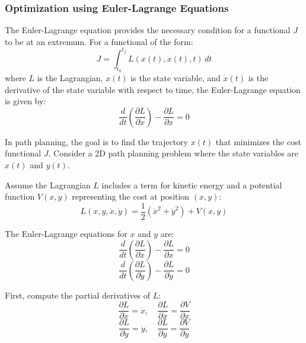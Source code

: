 \documentclass[12pt]{article}
\begin{document}
\subsubsection{Optimization using Euler-Lagrange Equations}
The Euler-Lagrange equation provides the necessary condition for a functional \( J \) to be at an extremum. For a functional of the form:
\begin{equation}
    J = \int_{t_0}^{t_f} L(x(t), \dot{x}(t), t) \, dt
\end{equation}
where \( L \) is the Lagrangian, \( x(t) \) is the state variable, and \( \dot{x}(t) \) is the derivative of the state variable with respect to time, the Euler-Lagrange equation is given by:
\begin{equation}
    \frac{d}{dt} \left( \frac{\partial L}{\partial \dot{x}} \right) - \frac{\partial L}{\partial x} = 0
\end{equation}



In path planning, the goal is to find the trajectory \( x(t) \) that minimizes the cost functional \( J \). Consider a 2D path planning problem where the state variables are \( x(t) \) and \( y(t) \).



Assume the Lagrangian \( L \) includes a term for kinetic energy and a potential function \( V(x, y) \) representing the cost at position \( (x, y) \):
\begin{equation}
    L(x, y, \dot{x}, \dot{y}) = \frac{1}{2} (\dot{x}^2 + \dot{y}^2) + V(x, y)
\end{equation}

The Euler-Lagrange equations for \( x \) and \( y \) are:
\begin{equation}
    \frac{d}{dt} \left( \frac{\partial L}{\partial \dot{x}} \right) - \frac{\partial L}{\partial x} = 0
\end{equation}
\begin{equation}
    \frac{d}{dt} \left( \frac{\partial L}{\partial \dot{y}} \right) - \frac{\partial L}{\partial y} = 0
\end{equation}



First, compute the partial derivatives of \( L \):
\begin{equation}
    \frac{\partial L}{\partial \dot{x}} = \dot{x}, \quad \frac{\partial L}{\partial x} = \frac{\partial V}{\partial x}
\end{equation}
\begin{equation}
    \frac{\partial L}{\partial \dot{y}} = \dot{y}, \quad \frac{\partial L}{\partial y} = \frac{\partial V}{\partial y}
\end{equation}
\end{document}
